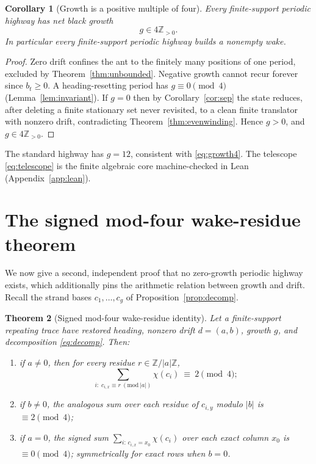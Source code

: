 \documentclass[11pt,reqno]{amsart}
\theoremstyle{plain}
\newtheorem{theorem}{Theorem}[section]
\newtheorem{corollary}[theorem]{Corollary}
\theoremstyle{definition}
\newcommand{\Z}{\mathbb{Z}}
\newcommand{\che}{\chi}
\newcommand{\drift}{d}
\newcommand{\growth}{g}
\begin{document}
\begin{corollary}[Growth is a positive multiple of four]\label{cor:growth4}
Every finite-support periodic highway has net black growth
\begin{equation}\label{eq:growth4}
\growth\in4\Z_{>0}.
\end{equation}
In particular every finite-support periodic highway builds a nonempty wake.
\end{corollary}

\begin{proof}
Zero drift confines the ant to the finitely many positions of one period, excluded by
Theorem~\ref{thm:unbounded}. Negative growth cannot recur forever since $b_t\ge0$. A
heading-resetting period has $\growth\equiv0\pmod4$ (Lemma~\ref{lem:invariant}). If
$\growth=0$ then by Corollary~\ref{cor:sep} the state reduces, after deleting a finite
stationary set never revisited, to a clean finite translator with nonzero drift,
contradicting Theorem~\ref{thm:evenwinding}. Hence $\growth>0$, and
$\growth\in4\Z_{>0}$.
\end{proof}

The standard highway has $\growth=12$, consistent with \eqref{eq:growth4}. The
telescope \eqref{eq:telescope} is the finite algebraic core machine-checked in Lean
(Appendix~\ref{app:lean}).

\section{The signed mod-four wake-residue theorem}\label{sec:residue}

We now give a second, independent proof that no zero-growth periodic highway exists,
which additionally pins the arithmetic relation between growth and drift. Recall the
strand bases $c_1,\dots,c_\growth$ of Proposition~\ref{prop:decomp}.

\begin{theorem}[Signed mod-four wake-residue identity]\label{thm:residue}
Let a finite-support repeating trace have restored heading, nonzero drift
$\drift=(a,b)$, growth $\growth$, and decomposition \eqref{eq:decomp}. Then:
\begin{enumerate}[label=\textup{(\roman*)}]
\item if $a\neq0$, then for every residue $r\in\Z/|a|\Z$,
\begin{equation}\label{eq:res-a}
\sum_{i:\;c_{i,x}\equiv r\ (\mathrm{mod}\ |a|)}\che(c_i)\ \equiv\ 2\pmod4;
\end{equation}
\item if $b\neq0$, the analogous sum over each residue of $c_{i,y}$ modulo $|b|$ is
$\equiv2\pmod4$;
\item if $a=0$, the signed sum $\sum_{i:\,c_{i,x}=x_0}\che(c_i)$ over each exact
column $x_0$ is $\equiv0\pmod4$; symmetrically for exact rows when $b=0$.
\end{enumerate}
\end{theorem}
\end{document}
